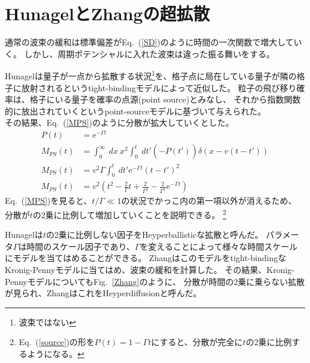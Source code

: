 \documentclass[autodetect-engine,dvipdfmx-if-dvi,ja=standard,a4paper,layout=v2]{bxjsreport}
\newcommand{\eref}[1]{Eq.~(\ref{#1})}
\newcommand{\fref}[1]{Fig.~\ref{#1}}
\begin{document}
    \section{HunagelとZhangの超拡散}
    通常の波束の緩和は標準偏差が\eref{SD}のように時間の一次関数で増大していく。
    しかし、周期ポテンシャルに入れた波束は違った振る舞いをする。\par
    Hunagelは量子が一点から拡散する状況\footnote{波束ではない}を、格子点に局在している量子が隣の格子に放射されるというtight-bindingモデルによって近似した。
    粒子の飛び移り確率は、格子にいる量子を確率の点源(point source)とみなし、
    それから指数関数的に放出されていくというpoint-sourceモデルに基づいて与えられた。\\
    その結果、\eref{MPS}のように分散が拡大していくとした。
    \begin{align}
    P(t) &= \mathrm{e}^{-\Gamma t}\label{source}\\
    M_{PS}(t)&=\int_{0}^{\infty}\:dx\:x^2\int_{0}^{t}\:dt'(-\dot{P}(t'))\delta(x-v(t-t'))\label{variant}\\
    M_{PS}(t)&=v^2\Gamma\int_{0}^{t}\:dt'\mathrm{e}^{-\Gamma t}(t-t')^2\nonumber\\
    M_{PS}(t)&=v^2\left(t^2-\frac{2}{\Gamma}t+\frac{2}{\Gamma^2}-\frac{2}{\Gamma^2}\mathrm{e}^{-\Gamma t} \right)\label{MPS}
    \end{align}
    \eref{MPS}を見ると、$t/\Gamma \ll 1$の状況でかっこ内の第一項以外が消えるため、
    分散が$t$の2乗に比例して増加していくことを説明できる。
    \footnote{\eref{source}の形を$P(t)=1-\Gamma t$にすると、分散が完全に$t$の2乗に比例するようになる。}\par
    Hunagelは$t$の2乗に比例しない因子をHeyperballisticな拡散と呼んだ。
    パラメータ$\Gamma$は時間のスケール因子であり、$\Gamma$を変えることによって様々な時間スケールにモデルを当てはめることができる。
    Zhangはこのモデルをtight-bindingなKronig-Pennyモデルに当てはめ、波束の緩和を計算した。
    その結果、Kronig-Pennyモデルについても\fref{Zhang}のように、
    分散が時間の2乗に乗らない拡散が見られ、ZhangはこれをHeyperdiffusionと呼んだ。
\end{document}
